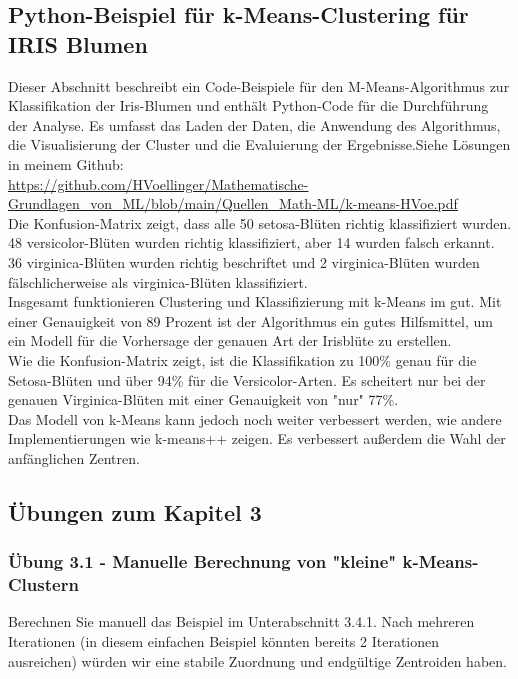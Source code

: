 \documentclass[12pt]{article}
\begin{document}
\subsection{Python-Beispiel für k-Means-Clustering für IRIS Blumen}
%
Dieser Abschnitt beschreibt ein Code-Beispiele für den M-Means-Algorithmus zur Klassifikation der Iris-Blumen und enthält Python-Code für die Durchführung der Analyse. Es umfasst das Laden der Daten, die Anwendung des Algorithmus, die Visualisierung der Cluster und die Evaluierung der Ergebnisse.Siehe Lösungen in meinem Github:\\ 
%
\url{https://github.com/HVoellinger/Mathematische-Grundlagen_von_ML/blob/main/Quellen_Math-ML/k-means-HVoe.pdf} \\[0.2cm]
%
Die Konfusion-Matrix zeigt, dass alle 50 setosa-Blüten richtig klassifiziert wurden.\\ 48 versicolor-Blüten wurden richtig klassifiziert, aber 14 wurden falsch erkannt. \\ 36 virginica-Blüten wurden richtig beschriftet und 2 virginica-Blüten wurden fälschlicherweise als virginica-Blüten klassifiziert.\\[0.2cm]
%
Insgesamt funktionieren  Clustering und Klassifizierung mit k-Means im {\color{blue}{IRIS-Blumen Datensatz}}  gut. Mit einer Genauigkeit von 89 Prozent ist der Algorithmus ein gutes Hilfsmittel, um ein Modell für die Vorhersage der genauen Art der Irisblüte zu erstellen.\\
Wie die Konfusion-Matrix zeigt, ist die Klassifikation zu 100\% genau
für die Setosa-Blüten und über 94\% für die Versicolor-Arten. Es scheitert nur bei der genauen Virginica-Blüten mit einer Genauigkeit von "nur" 77\%.\\[0.2cm]
Das Modell von k-Means kann jedoch noch weiter verbessert werden, wie andere  Implementierungen wie k-means++ zeigen. Es verbessert außerdem die Wahl der anfänglichen Zentren.
%
\newpage

\subsection{Übungen zum Kapitel 3}

\subsubsection{Übung 3.1 - Manuelle Berechnung von "kleine" k-Means-Clustern}
Berechnen Sie manuell das Beispiel im Unterabschnitt 3.4.1. Nach mehreren Iterationen (in diesem einfachen Beispiel könnten bereits 2 Iterationen ausreichen) würden wir eine stabile Zuordnung und endgültige Zentroiden haben. 
\end{document}
